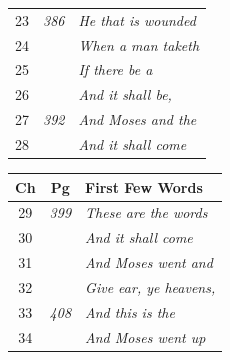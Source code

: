\documentclass{article}
\newlength{\minipageheight}
\newlength{\minipagewidth}
\begin{document}
\begin{minipage}[r][\minipageheight][t]{\minipagewidth}
\begin{longtable}{ccl}
        23          & \textit{386} & \textit{He that is wounded}        \\
        24          &              & \textit{When a man taketh}         \\
        25          &              & \textit{If there be a}             \\
        26          &              & \textit{And it shall be,}          \\
        27          & \textit{392} & \textit{And Moses and the}         \\
        28          &              & \textit{And it shall come}         \\
    \end{longtable}
\end{minipage}%
%

%
\begin{minipage}[r][\minipageheight][t]{\minipagewidth}%
    \begin{longtable}{ccl}
        \textbf{Ch} & \textbf{Pg}  & \textbf{First Few Words}            \\%
        \hline%
        \endfirsthead%
        29          & \textit{399} & \textit{These are the words}        \\
        30          &              & \textit{And it shall come}          \\
        31          &              & \textit{And Moses went and}         \\
        32          &              & \textit{Give ear, ye heavens,}      \\
        33          & \textit{408} & \textit{And this is the}            \\
        34          &              & \textit{And Moses went up}          \\


\end{longtable}
\end{minipage}
\end{document}
